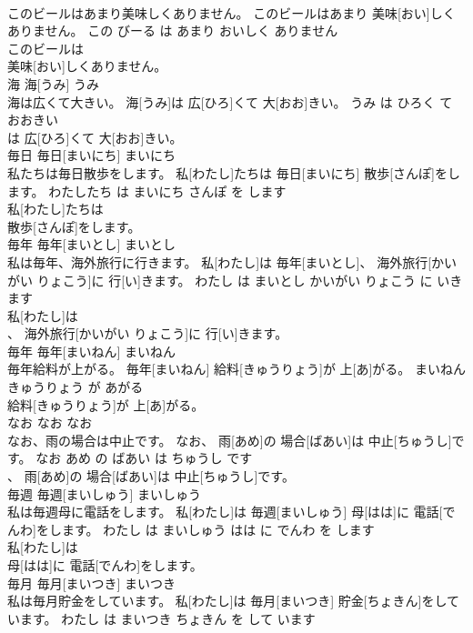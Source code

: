 \documentclass[8pt]{extreport}
\begin{document}
\begin{CJK}{UTF8}{min}
\\	このビールはあまり美味しくありません。	このビールはあまり 美味[おい]しくありません。	この びーる は あまり おいしく ありません	
\\	このビールは
\\	美味[おい]しくありません。			
\\	海	海[うみ]	うみ	
\\	海は広くて大きい。	海[うみ]は 広[ひろ]くて 大[おお]きい。	うみ は ひろく て おおきい	
\\	は 広[ひろ]くて 大[おお]きい。			
\\	毎日	毎日[まいにち]	まいにち	
\\	私たちは毎日散歩をします。	私[わたし]たちは 毎日[まいにち] 散歩[さんぽ]をします。	わたしたち は まいにち さんぽ を します	
\\	私[わたし]たちは
\\	散歩[さんぽ]をします。			
\\	毎年	毎年[まいとし]	まいとし	
\\	私は毎年、海外旅行に行きます。	私[わたし]は 毎年[まいとし]、 海外旅行[かいがい りょこう]に 行[い]きます。	わたし は まいとし かいがい りょこう に いきます	
\\	私[わたし]は
\\	、 海外旅行[かいがい りょこう]に 行[い]きます。			
\\	毎年	毎年[まいねん]	まいねん	
\\	毎年給料が上がる。	毎年[まいねん] 給料[きゅうりょう]が 上[あ]がる。	まいねん きゅうりょう が あがる	
\\	給料[きゅうりょう]が 上[あ]がる。			
\\	なお	なお	なお	
\\	なお、雨の場合は中止です。	なお、 雨[あめ]の 場合[ばあい]は 中止[ちゅうし]です。	なお あめ の ばあい は ちゅうし です	
\\	、 雨[あめ]の 場合[ばあい]は 中止[ちゅうし]です。			
\\	毎週	毎週[まいしゅう]	まいしゅう	
\\	私は毎週母に電話をします。	私[わたし]は 毎週[まいしゅう] 母[はは]に 電話[でんわ]をします。	わたし は まいしゅう はは に でんわ を します	
\\	私[わたし]は
\\	母[はは]に 電話[でんわ]をします。			
\\	毎月	毎月[まいつき]	まいつき	
\\	私は毎月貯金をしています。	私[わたし]は 毎月[まいつき] 貯金[ちょきん]をしています。	わたし は まいつき ちょきん を して います	

\end{CJK}
\end{document}
